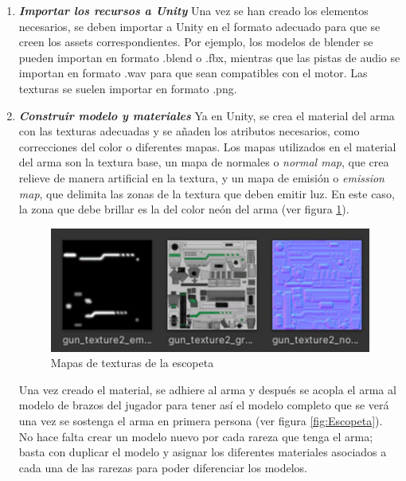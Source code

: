 \begin{enumerate}
    \item \textbf{\textit{Importar los recursos a Unity}}
    Una vez se han creado los elementos necesarios, se deben importar a Unity en el formato adecuado para que se creen los assets correspondientes. Por ejemplo, los modelos de blender se pueden importan en formato .blend o .fbx, mientras que las pistas de audio se importan en formato .wav para que sean compatibles con el motor.
    Las texturas se suelen importar en formato .png.
    
    \item \textbf{\textit{Construir modelo y materiales}}
    Ya en Unity, se crea el material del arma con las texturas adecuadas y se añaden los atributos necesarios, como correcciones del color o diferentes mapas. Los mapas utilizados en el material del arma son la textura base, un mapa de normales o \textit{normal map}, que crea relieve de manera artificial en la textura, y un mapa de emisión o \textit{emission map}, que delimita las zonas de la textura que deben emitir luz. En este caso, la zona que debe brillar es la del color neón del arma (ver figura \ref{fig:TexturasEscopeta}).
    
    \begin{figure}[h]
    \centering
    \includegraphics[scale=0.45]{img/ShotgunTexture.jpg}
    \caption{Mapas de texturas de la escopeta}
    \label{fig:TexturasEscopeta}
    \end{figure}
    
    Una vez creado el material, se adhiere al arma y después se acopla el arma al modelo de brazos del jugador para tener así el modelo completo que se verá una vez se sostenga el arma en primera persona (ver figura \ref{fig:Escopeta}).
    \\No hace falta crear un modelo nuevo por cada rareza que tenga el arma; basta con duplicar el modelo y asignar los diferentes materiales asociados a cada una de las rarezas para poder diferenciar los modelos.
    

\end{enumerate}
